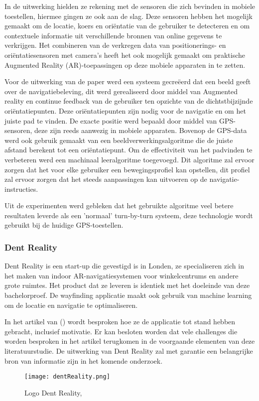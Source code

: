 In de uitwerking hielden ze rekening met de sensoren die zich bevinden in mobiele toestellen, hiermee gingen ze ook aan de slag. Deze sensoren hebben het mogelijk gemaakt om de locatie, koers en oriëntatie van de gebruiker te detecteren en om contextuele informatie uit verschillende bronnen van online gegevens te verkrijgen. Het combineren van de verkregen data van positionerings- en oriëntatiesensoren met camera's heeft het ook mogelijk gemaakt om praktische Augmented Reality (AR)-toepassingen op deze mobiele apparaten in te zetten. 

Voor de uitwerking van de paper werd een systeem gecreëerd dat een beeld geeft over de navigatiebeleving, dit werd gerealiseerd door middel van Augmented reality en continue feedback van de gebruiker ten opzichte van de dichtstbijzijnde oriëntatiepunten. Deze oriëntatiepunten zijn nodig voor de navigatie en om het juiste pad te vinden. De exacte positie werd bepaald door middel van GPS-sensoren, deze zijn reeds aanwezig in mobiele apparaten. Bovenop de GPS-data werd ook gebruik gemaakt van een beeldverwerkingsalgoritme die de juiste afstand berekent tot een oriëntatiepunt. Om de effectiviteit van het padvinden te verbeteren werd een machinaal leeralgoritme toegevoegd. Dit algoritme zal ervoor zorgen dat het voor elke gebruiker een bewegingsprofiel kan opstellen, dit profiel zal ervoor zorgen dat het steeds aanpassingen kan uitvoeren op de navigatie-instructies.

Uit de experimenten werd gebleken dat het gebruikte algoritme veel betere resultaten leverde als een 'normaal' turn-by-turn systeem, deze technologie wordt gebruikt bij de huidige GPS-toestellen.

\subsubsection{Dent Reality}
Dent Reality is een start-up die gevestigd is in Londen, ze specialiseren zich in het maken van indoor AR-navigatiesystemen voor winkelcentrums en andere grote ruimtes. Het product dat ze leveren is identiek met het doeleinde van deze bachelorproef. De wayfinding applicatie maakt ook gebruik van machine learning om de locatie en navigatie te optimaliseren.

In het artikel van \textcite{Hart2019} () wordt besproken hoe ze de applicatie tot stand hebben gebracht, inclusief motivatie. Er kan besloten worden dat vele challenges die worden besproken in het artikel terugkomen in de voorgaande elementen van deze literatuurstudie. De uitwerking van Dent Reality zal met garantie een belangrijke bron van informatie zijn in het komende onderzoek.

\begin{figure}[H]
	\centering
	\texttt{[image: dentReality.png]}
	\caption{Logo Dent Reality, \autocite{Hart2019}}
\end{figure}

